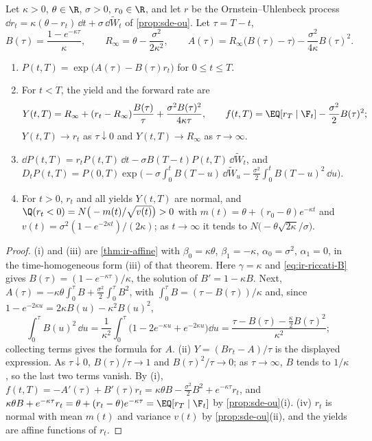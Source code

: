 \begin{proposition}\label{prop:ir-vasicek}
Let $\kappa>0$, $\theta\in\R$, $\sigma>0$, $r_0\in\R$, and let $r$ be the Ornstein--Uhlenbeck
process $\dd r_t=\kappa(\theta-r_t)\,\dd t+\sigma\,\dd\widetilde W_t$ of \cref{prop:sde-ou}. Let
$\tau=T-t$,
\[
  B(\tau)=\frac{1-e^{-\kappa\tau}}{\kappa},\qquad R_\infty=\theta-\frac{\sigma^2}{2\kappa^2},\qquad
  A(\tau)=R_\infty\big(B(\tau)-\tau\big)-\frac{\sigma^2}{4\kappa}B(\tau)^2 .
\]
\begin{enumerate}[label=(\roman*)]
  \item $P(t,T)=\exp\big(A(\tau)-B(\tau)r_t\big)$ for $0\le t\le T$.
  \item For $t<T$, the yield and the forward rate are
    \[
      Y(t,T)=R_\infty+(r_t-R_\infty)\frac{B(\tau)}\tau+\frac{\sigma^2B(\tau)^2}{4\kappa\tau},\qquad
      f(t,T)=\EQ[r_T\mid\F_t]-\frac{\sigma^2}2B(\tau)^2 ;
    \]
    $Y(t,T)\to r_t$ as $\tau\downarrow0$ and $Y(t,T)\to R_\infty$ as $\tau\to\infty$.
  \item $\dd P(t,T)=r_tP(t,T)\,\dd t-\sigma B(T-t)P(t,T)\,\dd\widetilde W_t$, and
    $D_tP(t,T)=P(0,T)\exp\big(-\sigma\int_0^tB(T-u)\,\dd\widetilde W_u-\frac{\sigma^2}2\int_0^tB(T-u)^2\,\dd u\big)$.
  \item For $t>0$, $r_t$ and all yields $Y(t,T)$ are normal, and
    $\Q(r_t<0)=N\big(-m(t)/\sqrt{v(t)}\big)>0$ with $m(t)=\theta+(r_0-\theta)e^{-\kappa t}$ and
    $v(t)=\sigma^2(1-e^{-2\kappa t})/(2\kappa)$; as $t\to\infty$ it tends to
    $N\big(-\theta\sqrt{2\kappa}/\sigma\big)$.
\end{enumerate}
\end{proposition}

\begin{proof}
(i) and (iii) are \cref{thm:ir-affine} with $\beta_0=\kappa\theta$, $\beta_1=-\kappa$, $\alpha_0=\sigma^2$,
$\alpha_1=0$, in the time-homogeneous form (iii) of that theorem. Here $\gamma=\kappa$ and
\eqref{eq:ir-riccati-B} gives $B(\tau)=(1-e^{-\kappa\tau})/\kappa$, the solution of $B'=1-\kappa B$.
Next, $A(\tau)=-\kappa\theta\int_0^\tau B+\frac{\sigma^2}2\int_0^\tau B^2$, with
$\int_0^\tau B=(\tau-B(\tau))/\kappa$ and, since $1-e^{-2\kappa u}=2\kappa B(u)-\kappa^2B(u)^2$,
\[
  \int_0^\tau B(u)^2\,\dd u=\frac1{\kappa^2}\int_0^\tau\big(1-2e^{-\kappa u}+e^{-2\kappa u}\big)\dd u
  =\frac{\tau-B(\tau)-\frac\kappa2B(\tau)^2}{\kappa^2};
\]
collecting terms gives the formula for $A$. (ii) $Y=(B r_t-A)/\tau$ is the displayed
expression. As $\tau\downarrow0$, $B(\tau)/\tau\to1$ and $B(\tau)^2/\tau\to0$; as $\tau\to\infty$, $B$
tends to $1/\kappa$, so the last two terms vanish. By (i),
$f(t,T)=-A'(\tau)+B'(\tau)r_t=\kappa\theta B-\frac{\sigma^2}2B^2+e^{-\kappa\tau}r_t$, and
$\kappa\theta B+e^{-\kappa\tau}r_t=\theta+(r_t-\theta)e^{-\kappa\tau}=\EQ[r_T\mid\F_t]$ by
\cref{prop:sde-ou}(i). (iv) $r_t$ is normal with mean $m(t)$ and variance $v(t)$ by
\cref{prop:sde-ou}(ii), and the yields are affine functions of $r_t$.
\end{proof}


